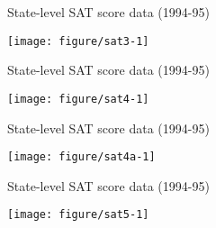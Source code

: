 \documentclass[table]{beamer}\usepackage[]{graphicx}\usepackage[]{color}
\makeatletter
\def\maxwidth{ %
  \ifdim\Gin@nat@width>\linewidth
    \linewidth
  \else
    \Gin@nat@width
  \fi
}
\newenvironment{knitrout}{}{} %
\makeatother
\begin{document}



\begin{frame}[fragile]{State-level SAT score data (1994-95)}

\begin{knitrout}
\color{fgcolor}
\texttt{[image: figure/sat3-1]} 

\end{knitrout}


\end{frame}


\begin{frame}[fragile]{State-level SAT score data (1994-95)}

\begin{knitrout}
\color{fgcolor}
\texttt{[image: figure/sat4-1]} 

\end{knitrout}

\end{frame}




\begin{frame}[fragile]{State-level SAT score data (1994-95)}

\begin{knitrout}
\color{fgcolor}
\texttt{[image: figure/sat4a-1]} 

\end{knitrout}

\end{frame}



\begin{frame}[fragile]{State-level SAT score data (1994-95)}

\begin{knitrout}
\color{fgcolor}
\texttt{[image: figure/sat5-1]} 

\end{knitrout}

\end{frame}
\end{document}
